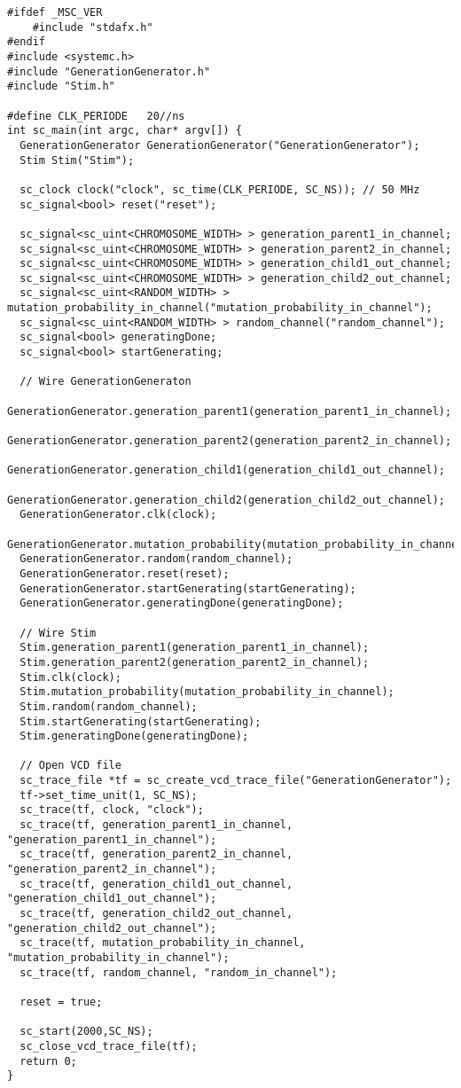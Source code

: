 \begin{lstlisting}[style=customc++,caption={Testbench for GenerationGenerator},label={lst:generatorTestbench}]
#ifdef _MSC_VER
	#include "stdafx.h"
#endif
#include <systemc.h>
#include "GenerationGenerator.h"
#include "Stim.h"

#define CLK_PERIODE   20//ns
int sc_main(int argc, char* argv[]) {
  GenerationGenerator GenerationGenerator("GenerationGenerator");
  Stim Stim("Stim");
  
  sc_clock clock("clock", sc_time(CLK_PERIODE, SC_NS)); // 50 MHz
  sc_signal<bool> reset("reset");

  sc_signal<sc_uint<CHROMOSOME_WIDTH> > generation_parent1_in_channel;
  sc_signal<sc_uint<CHROMOSOME_WIDTH> > generation_parent2_in_channel;
  sc_signal<sc_uint<CHROMOSOME_WIDTH> > generation_child1_out_channel;
  sc_signal<sc_uint<CHROMOSOME_WIDTH> > generation_child2_out_channel;
  sc_signal<sc_uint<RANDOM_WIDTH> > mutation_probability_in_channel("mutation_probability_in_channel");
  sc_signal<sc_uint<RANDOM_WIDTH> > random_channel("random_channel");
  sc_signal<bool> generatingDone;
  sc_signal<bool> startGenerating;

  // Wire GenerationGeneraton
  GenerationGenerator.generation_parent1(generation_parent1_in_channel);
  GenerationGenerator.generation_parent2(generation_parent2_in_channel);
  GenerationGenerator.generation_child1(generation_child1_out_channel);
  GenerationGenerator.generation_child2(generation_child2_out_channel);
  GenerationGenerator.clk(clock);
  GenerationGenerator.mutation_probability(mutation_probability_in_channel);
  GenerationGenerator.random(random_channel);
  GenerationGenerator.reset(reset);
  GenerationGenerator.startGenerating(startGenerating);
  GenerationGenerator.generatingDone(generatingDone);

  // Wire Stim
  Stim.generation_parent1(generation_parent1_in_channel);
  Stim.generation_parent2(generation_parent2_in_channel);
  Stim.clk(clock);
  Stim.mutation_probability(mutation_probability_in_channel);
  Stim.random(random_channel);
  Stim.startGenerating(startGenerating);
  Stim.generatingDone(generatingDone);

  // Open VCD file
  sc_trace_file *tf = sc_create_vcd_trace_file("GenerationGenerator");
  tf->set_time_unit(1, SC_NS);
  sc_trace(tf, clock, "clock");
  sc_trace(tf, generation_parent1_in_channel, "generation_parent1_in_channel");
  sc_trace(tf, generation_parent2_in_channel, "generation_parent2_in_channel");
  sc_trace(tf, generation_child1_out_channel, "generation_child1_out_channel");
  sc_trace(tf, generation_child2_out_channel, "generation_child2_out_channel");
  sc_trace(tf, mutation_probability_in_channel, "mutation_probability_in_channel");
  sc_trace(tf, random_channel, "random_in_channel");
  
  reset = true;

  sc_start(2000,SC_NS);
  sc_close_vcd_trace_file(tf);
  return 0;
}
\end{lstlisting}

